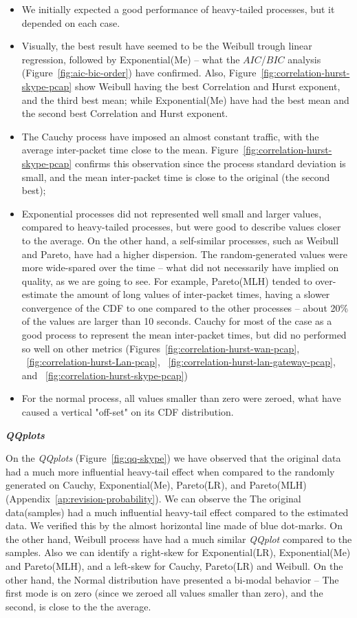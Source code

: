 \begin{itemize}
    \item We initially expected a good performance of heavy-tailed processes, but it depended on each case.
    \item Visually, the best result have seemed to be
    the Weibull trough linear regression, followed by Exponential(Me) -- what the $AIC$/$BIC$ analysis (Figure~\ref{fig:aic-bic-order}) have confirmed. Also, Figure~\ref{fig:correlation-hurst-skype-pcap} show Weibull having the best Correlation and Hurst exponent, and the third best mean; while Exponential(Me) have had the best mean and the second best Correlation and Hurst exponent. 
    \item The Cauchy process have imposed an almost constant traffic, with the average inter-packet time close to the mean. Figure~\ref{fig:correlation-hurst-skype-pcap} confirms this observation since the process standard deviation is small, and the mean inter-packet time is close to the original (the second best);
    \item Exponential processes did not represented well small and larger values, compared to heavy-tailed processes, but were good to describe values closer to the average. On the other hand, a self-similar processes, such as Weibull and Pareto, have had a higher dispersion. The random-generated values were more wide-spared over the time -- what did not necessarily have implied on quality, as we are going to see. For example, Pareto(MLH) tended to over-estimate the amount of long values of inter-packet times, having a slower convergence of the CDF to one compared to the other processes -- about 20\% of the values are larger than 10 seconds. Cauchy for most of the case as a good process to represent the mean inter-packet times, but did no performed so well on other metrics (Figures~\ref{fig:correlation-hurst-wan-pcap}, ~\ref{fig:correlation-hurst-Lan-pcap}, ~\ref{fig:correlation-hurst-lan-gateway-pcap}, and  ~\ref{fig:correlation-hurst-skype-pcap})
    \item For the normal process, all values smaller than zero were zeroed, what have caused a vertical "off-set" on its CDF distribution. 
\end{itemize}

\smallskip  \noindent  \textbf{\textit{QQplots}}

On the \textit{QQplots} (Figure~\ref{fig:qq-skype}) we have observed that the original data had a much more influential heavy-tail effect when compared to the randomly generated on Cauchy, Exponential(Me), Pareto(LR), and Pareto(MLH) (Appendix~\ref{ap:revision-probability}). We can observe  the The original data(samples) had a much influential heavy-tail effect compared to  the estimated data. We  verified this by the almost horizontal line made of blue dot-marks. On the other hand, Weibull process have had a much similar \textit{QQplot} compared to the samples.
Also we can identify a right-skew for Exponential(LR), Exponential(Me) and Pareto(MLH), and a left-skew for Cauchy, Pareto(LR) and Weibull.  On the other hand, the Normal distribution have presented a bi-modal behavior -- The first mode is on zero (since we zeroed all values smaller than zero), and the second, is close to the the average.



